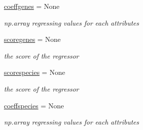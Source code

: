 \begin{DoxyCompactItemize}
\mbox{\label{class_py_c_u_b_1_1py_c_u_b_1_1_py_c_u_b_abf0e792c29eb4ea90049ca996cad0022}} 
\mbox{\hyperlink{class_py_c_u_b_1_1py_c_u_b_1_1_py_c_u_b_abf0e792c29eb4ea90049ca996cad0022}{coeffgenes}} = None
\begin{DoxyCompactList}\small\item\em np.\+array regressing values for each attributes \end{DoxyCompactList}\item 
\mbox{\label{class_py_c_u_b_1_1py_c_u_b_1_1_py_c_u_b_a70eae30eb6f055c7955969ec573a3f23}} 
\mbox{\hyperlink{class_py_c_u_b_1_1py_c_u_b_1_1_py_c_u_b_a70eae30eb6f055c7955969ec573a3f23}{scoregenes}} = None
\begin{DoxyCompactList}\small\item\em the score of the regressor \end{DoxyCompactList}\item 
\mbox{\label{class_py_c_u_b_1_1py_c_u_b_1_1_py_c_u_b_acbae28b1a15a26eedfa82aed4c8ae24f}} 
\mbox{\hyperlink{class_py_c_u_b_1_1py_c_u_b_1_1_py_c_u_b_acbae28b1a15a26eedfa82aed4c8ae24f}{scorespecies}} = None
\begin{DoxyCompactList}\small\item\em the score of the regressor \end{DoxyCompactList}\item 
\mbox{\label{class_py_c_u_b_1_1py_c_u_b_1_1_py_c_u_b_a37440d3a799d825552f477fc4a44c54f}} 
\mbox{\hyperlink{class_py_c_u_b_1_1py_c_u_b_1_1_py_c_u_b_a37440d3a799d825552f477fc4a44c54f}{coeffspecies}} = None
\begin{DoxyCompactList}\small\item\em np.\+array regressing values for each attributes \end{DoxyCompactList}\end{DoxyCompactItemize}
